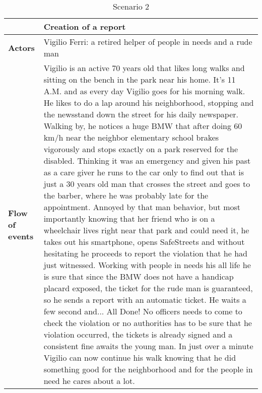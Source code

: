 \begin{table}[!htbp]
\centering
\begin{tabular}{lp{10.8cm}}
\hline
\bf\large  &\bf\large Creation of a report\\
\hline
\hline

\bf Actors&Vigilio Ferri: a retired helper of people in needs and a rude man\\
\hline
\bf Flow of events&
Vigilio is an active 70 years old that likes long walks and sitting on the bench in the park near his home. It's 11 A.M. and as every day Vigilio goes for his morning walk. He likes to do a lap around his neighborhood, stopping and the newsstand down the street for his daily newspaper. Walking by, he notices a huge BMW that after doing 60 km/h near the neighbor elementary school brakes vigorously and stops exactly on a park reserved for the disabled. Thinking it was an emergency and given his past as a care giver he runs to the car only to find out that is just a 30 years old man that crosses the street and goes to the barber, where he was probably late for the appointment. Annoyed by that man behavior, but most importantly knowing that her friend who is on a wheelchair lives right near that park and could need it, he takes out his smartphone, opens SafeStreets and without hesitating he proceeds to report the violation that he had just witnessed. Working with people in needs his all life he is sure that since the BMW does not have a handicap placard exposed, the ticket for the rude man is guaranteed, so he sends a report with an automatic ticket. He waits a few second and... All Done! No officers needs to come to check the violation or no authorities has to be sure that he violation occurred, the tickets is already signed and a consistent fine awaits the young man. In just over a minute Vigilio can now continue his walk knowing that he did something good for the neighborhood and for the people in need he cares about a lot.
\end{tabular}
\caption{Scenario 2} 
\label{tab:scenariotwo}
\end{table}